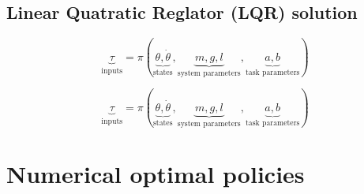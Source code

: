 \newpage
\subsection{Linear Quatratic Reglator (LQR) solution}


\begin{equation}
\underbrace{\tau}_{\text{inputs}}
=
\pi \left(
\underbrace{ \theta, \dot{\theta} }_{\text{states}},
\underbrace{ m , g , l }_{\text{system parameters}},
\underbrace{ a , b }_{\text{task parameters}}
\right)
\end{equation}

\begin{equation}
\underbrace{\tau}_{\text{inputs}}
=
\pi \left(
\underbrace{ \theta, \dot{\theta} }_{\text{states}},
\underbrace{ m , g , l }_{\text{system parameters}},
\underbrace{ a , b }_{\text{task parameters}}
\right)
\end{equation}


\newpage
\section{Numerical optimal policies}

